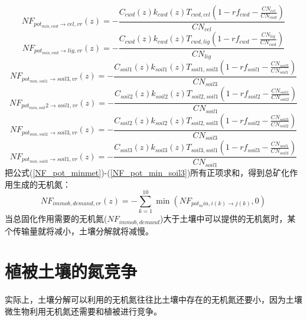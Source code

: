 \begin{equation}
    NF_{pot_{min,cwd}\rightarrow cel,vr}\left(z\right)=-\frac{C_{cwd}\left(z\right)k_{cwd}\left(z\right)T_{cwd,cel}\left(1-rf_{cwd}-\frac{CN_{cel}}{CN_{cwd}}\right)}{CN_{cel}}
\end{equation}
\begin{equation}
    NF_{pot_{min,cwd}\rightarrow lig,vr}\left(z\right)=-\frac{C_{cwd}\left(z\right)k_{cwd}\left(z\right)T_{cwd,lig}\left(1-rf_{cwd}-\frac{CN_{lig}}{CN_{cwd}}\right)}{CN_{lig}}
\end{equation}
\begin{equation}
    NF_{pot_{min,soil1}\rightarrow soil3,vr}\left(z\right)=-\frac{C_{soil1}\left(z\right)k_{soil1}\left(z\right)T_{soil1,soil3}\left(1-rf_{soil1}-\frac{CN_{soil3}}{CN_{soil1}}\right)}{CN_{soil3}}
\end{equation}
\begin{equation}
    NF_{pot_{min,soil}2\rightarrow soil1,vr}\left(z\right)=-\frac{C_{soil2}\left(z\right)k_{soil2}\left(z\right)T_{soil2,soil1}\left(1-rf_{soil2}-\frac{CN_{soil1}}{CN_{soil2}}\right)}{CN_{soil1}}
\end{equation}
\begin{equation}
    NF_{pot_{min,soil2}\rightarrow soil3,vr}\left(z\right)=-\frac{C_{soil2}\left(z\right)k_{soil2}\left(z\right)T_{soil2,soil3}\left(1-rf_{soil2}-\frac{CN_{soil3}}{CN_{soil2}}\right)}{CN_{soil3}}
\end{equation}
\begin{equation}\label{NF_pot_min_soil3}
    NF_{pot_{min,soil3}\rightarrow soil1,vr}\left(z\right)=-\frac{C_{soil3}\left(z\right)k_{soil3}\left(z\right)T_{soil3,soil1}\left(1-rf_{soil3}-\frac{CN_{soil1}}{CN_{soil3}}\right)}{CN_{soil1}}
\end{equation}
把公式(\ref{NF_pot_minmet})-(\ref{NF_pot_min_soil3})所有正项求和，得到总矿化作用生成的无机氮：
\begin{equation}\label{NF_immob_demand_vr}
    NF_{immob,demand,vr}\left(z\right)=-\sum_{k=1}^{10}\min{\left(NF_{pot_min,i\left(k\right)\rightarrow j\left(k\right)},0\right)}
\end{equation}
当总固化作用需要的无机氮($NF_{immob,demand}$)大于土壤中可以提供的无机氮时，某个传输量就将减小，土壤分解就将减慢。
\section{植被土壤的氮竞争}\label{植被土壤的氮竞争}
实际上，土壤分解可以利用的无机氮往往比土壤中存在的无机氮还要小，因为土壤微生物利用无机氮还需要和植被进行竞争。

